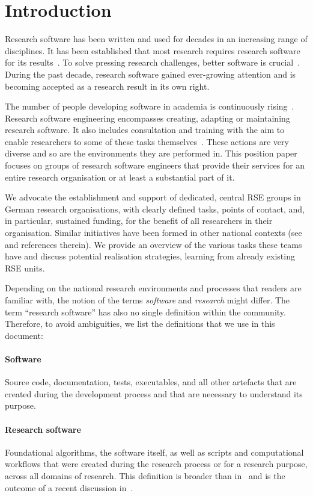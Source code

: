 \documentclass[10pt,letterpaper]{article}
\begin{document}
\section*{Introduction}
Research software has been written and used for decades in an increasing range of disciplines.
It has been established that most research requires research software for its results~\autocite{Hannay2009, Hettrick2015}.
To solve pressing research challenges, better software is crucial~\autocite{Goble2014}.
During the past decade, research software gained ever-growing attention and is becoming accepted as a research result in its own right.

The number of people developing software in academia is continuously rising~\autocite{Hannay2009, Hettrick2015}.
Research software engineering encompasses creating, adapting or maintaining research software.
It also includes consultation and training with the aim to enable researchers to some of these tasks themselves~\autocite{goth_foundational_competencies_2024}.
These actions are very diverse and so are the environments they are performed in.
This position paper focuses on groups of research software engineers that provide their services for an entire research organisation or at least a substantial part of it.

We advocate the establishment and support of dedicated, central RSE groups in German research organisations, with clearly defined tasks, points of contact, and, in particular, sustained funding, for the benefit of all researchers in their organisation.
Similar initiatives have been formed in other national contexts (see~\autocite{barkerkatz2024,martin2023} and references therein).
We provide an overview of the various tasks these teams have and discuss potential realisation strategies, learning from already existing RSE units.

Depending on the national research environments and processes that readers are familiar with, the notion of the terms \emph{software} and \emph{research} might differ.
The term “research software” has also no single definition within the community.
Therefore, to avoid ambiguities, we list the definitions that we use in this document:
\paragraph{Software}
Source code, documentation, tests, executables, and all other artefacts that are created during the development process and that are necessary to understand its purpose.
\paragraph{Research software}
Foundational algorithms, the software itself, as well as scripts and computational workflows that were created during the research process or for a research purpose, across all domains of research.
This definition is broader than in~\autocite{FAIR4RS} and is the outcome of a recent discussion in~\autocite{Gruenpeter2021}.
\end{document}
